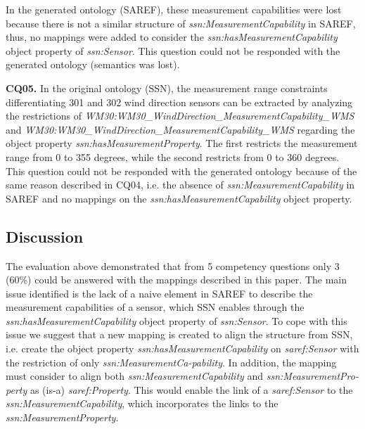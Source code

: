 \documentclass{sig-alternate-05-2015}
\begin{document}
In the generated ontology (SAREF), these measurement capabilities were lost because there is not a similar structure of \textit{ssn:\-MeasurementCapability} in SAREF, thus, no mappings were added to consider the  \textit{ssn:\-hasMeasurementCapability} object property of \textit{ssn:\-Sensor}. This question could not be responded with the generated ontology (semantics was lost).  

\noindent
\textbf{CQ05.} In the original ontology (SSN), the measurement range constraints differentiating 301 and 302 wind direction sensors can be extracted by analyzing the restrictions of \textit{WM30:\-WM30\-\_Wind\-Direction\-\_Measurement\-Capability\-\_WMS} and \textit{WM30:\-WM30\-\_Wind\-Direction\-\_Measurement\-Capability\-\_WMS} regarding the object property \textit{ssn:\-has\-Measurement\-Property}. The first restricts the measurement range from 0 to 355 degrees, while the second restricts from 0 to 360 degrees. This question could not be responded with the generated ontology because of the same reason described in CQ04, i.e. the absence of \textit{ssn:\-MeasurementCapability} in SAREF and no mappings on the \textit{ssn:\-hasMeasurementCapability} object property.


\subsection{Discussion}

The evaluation above demonstrated that from 5 competency questions only 3 (60\%) could be answered with the mappings described in this paper. The main issue identified is the lack of a naive element in SAREF to describe the measurement capabilities of a sensor, which SSN enables through the \textit{ssn:\-hasMeasurementCapability} object property of \textit{ssn:\-Sensor}. To cope with this issue we suggest that a new mapping is created to align the structure from SSN, i.e. create the object property \textit{ssn:\-has\-Measurement\-Capability} on \textit{saref:\-Sensor} with the restriction of only \textit{ssn:MeasurementCa-pability}. In addition, the mapping must consider to align both \textit{ssn:\-Measurement\-Capability} and \textit{ssn:\-Measurement\-Pro-perty} as (is-a) \textit{saref:\-Property}. This would enable the link of a \textit{saref:\-Sensor} to the \textit{ssn:\-Measurement\-Capability}, which incorporates the links to the \textit{ssn:\-Measurement\-Property}. 
\end{document}
